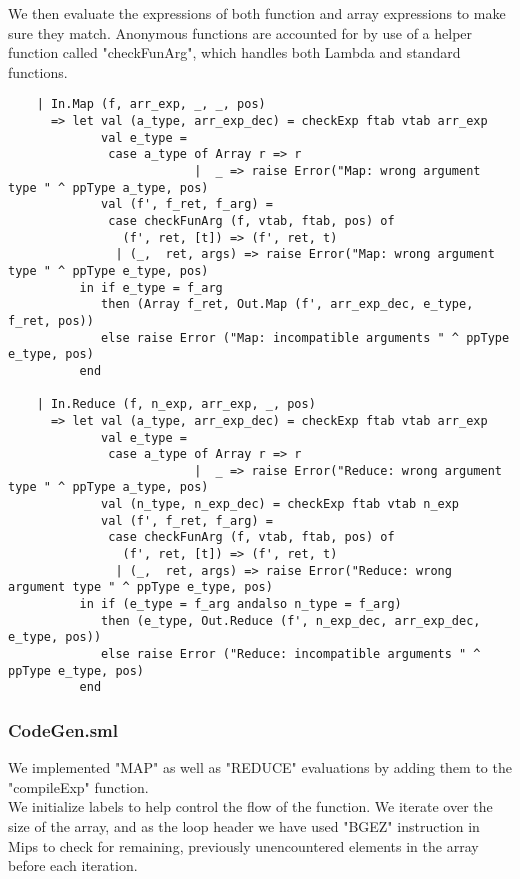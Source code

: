 \documentclass[12pt]{article}
\begin{document}
We then evaluate the expressions of both function and array expressions to make sure they match. Anonymous functions are accounted for by use of a helper function called "checkFunArg", which handles both Lambda and standard functions. 
\begin{verbatim}
    | In.Map (f, arr_exp, _, _, pos)
      => let val (a_type, arr_exp_dec) = checkExp ftab vtab arr_exp
             val e_type = 
              case a_type of Array r => r
                          |  _ => raise Error("Map: wrong argument type " ^ ppType a_type, pos)
             val (f', f_ret, f_arg) = 
              case checkFunArg (f, vtab, ftab, pos) of
                (f', ret, [t]) => (f', ret, t)
               | (_,  ret, args) => raise Error("Map: wrong argument type " ^ ppType e_type, pos)
          in if e_type = f_arg 
             then (Array f_ret, Out.Map (f', arr_exp_dec, e_type, f_ret, pos))
             else raise Error ("Map: incompatible arguments " ^ ppType e_type, pos)
          end
          
    | In.Reduce (f, n_exp, arr_exp, _, pos)
      => let val (a_type, arr_exp_dec) = checkExp ftab vtab arr_exp
             val e_type = 
              case a_type of Array r => r
                          |  _ => raise Error("Reduce: wrong argument type " ^ ppType a_type, pos)
             val (n_type, n_exp_dec) = checkExp ftab vtab n_exp
             val (f', f_ret, f_arg) = 
              case checkFunArg (f, vtab, ftab, pos) of
                (f', ret, [t]) => (f', ret, t)
               | (_,  ret, args) => raise Error("Reduce: wrong argument type " ^ ppType e_type, pos)
          in if (e_type = f_arg andalso n_type = f_arg)
             then (e_type, Out.Reduce (f', n_exp_dec, arr_exp_dec, e_type, pos))
             else raise Error ("Reduce: incompatible arguments " ^ ppType e_type, pos)
          end
\end{verbatim}
\subsubsection{CodeGen.sml}
We implemented "MAP" as well as "REDUCE" evaluations by adding them to the "compileExp" function. \\

We initialize labels to help control the flow of the function. We iterate over the size of the array, and as the loop header we have used "BGEZ" instruction in Mips to check for remaining, previously unencountered elements in the array before each iteration. \\
\end{document}

